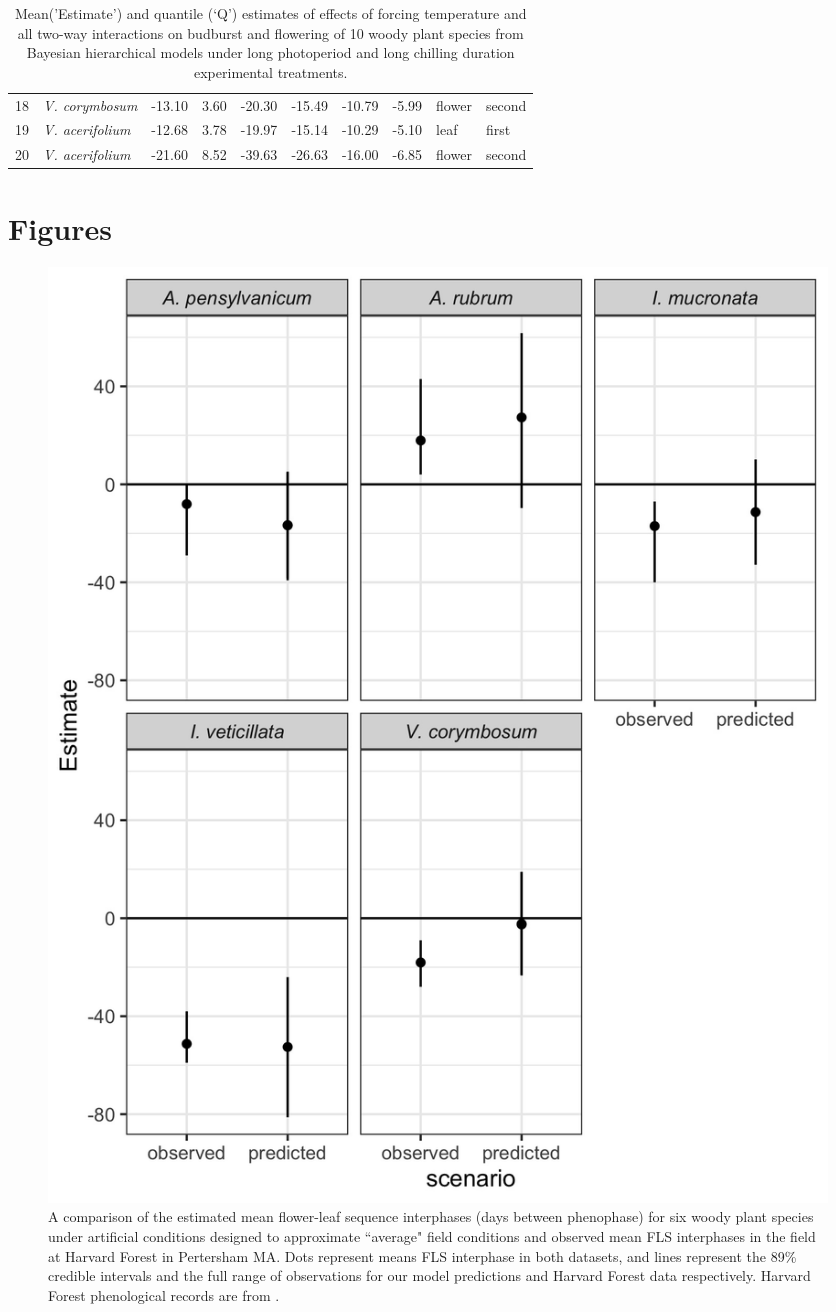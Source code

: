\documentclass{article}\usepackage[]{graphicx}\usepackage[]{color}
\begin{document}
\begin{table}[ht]
\begin{tabular}{l>{\itshape}lllllllll}
  18 & V. corymbosum & -13.10 & 3.60 & -20.30 & -15.49 & -10.79 & -5.99 & flower & second \\ 
  19 & V. acerifolium & -12.68 & 3.78 & -19.97 & -15.14 & -10.29 & -5.10 & leaf & first \\ 
  20 & V. acerifolium & -21.60 & 8.52 & -39.63 & -26.63 & -16.00 & -6.85 & flower & second \\ 
   \hline
\end{tabular}
\caption{Mean('Estimate') and quantile (`Q') estimates of effects of forcing temperature and all two-way interactions on budburst and flowering of 10 woody plant species from Bayesian hierarchical models under long photoperiod and long chilling duration experimental treatments. } 
\label{tab:phh}
\end{table}




\section*{Figures}

 \begin{figure}[!ht]
    \centering
 \includegraphics[width=.8\textwidth]{..//Plots/fieldmodcomparisions.jpeg}
    \caption{A comparison of the estimated mean flower-leaf sequence interphases (days between phenophase) for six woody plant species under artificial conditions designed to approximate ``average" field conditions and observed mean FLS interphases in the field at Harvard Forest in Pertersham MA. Dots represent means FLS interphase in both datasets, and lines represent the 89\% credible intervals and the full range of observations for our model predictions and Harvard Forest data respectively. Harvard Forest phenological records are from \citet{Okeefe2015}.}
    \label{fig:validate}
\end{figure}
\end{document}
